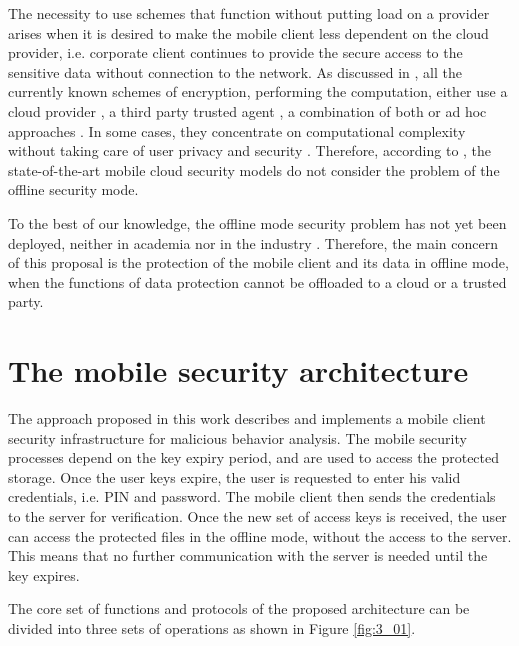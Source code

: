 The necessity to use schemes that function without putting load on a provider arises when it is desired to make the mobile client less dependent on the cloud provider, i.e. corporate client continues to provide the secure access to the sensitive data without connection to the network. As discussed in \cite{khan2015cloud}, all the currently known schemes of encryption, performing the computation, either use a cloud provider \cite{zhao2010trusted}, a third party trusted agent \cite{yang2011provable, heydari2016efficient}, a combination of both \cite{itani2010energy} or ad hoc approaches \cite{shila2016amcloud}. In some cases, they concentrate on computational complexity without taking care of user privacy and security \cite{ren2011lightweight}. Therefore, according to \cite{khan2013towards, khan2015cloud}, the state-of-the-art mobile cloud security models do not consider the problem of the offline security mode. 

To the best of our knowledge, the offline mode security problem has not yet been deployed, neither in academia nor in the industry \cite{yovel2014, khan2015cloud, khan2014survey, khan2013towards}. Therefore, the main concern of this proposal is the protection of the mobile client and its data in offline mode, when the functions of data protection cannot be offloaded to a cloud or a trusted party. 

\section{The mobile security architecture}
\label{sec:3_the_client_security_architecture}

The approach proposed in this work describes and implements a mobile client security infrastructure for malicious behavior analysis. The mobile security processes depend on the key expiry period, and are used to access the protected storage. Once the user keys expire, the user is requested to enter his valid credentials, i.e. PIN and password. The mobile client then sends the credentials to the server for verification. Once the new set of access keys is received, the user can access the protected files in the offline mode, without the access to the server. This means that no further communication with the server is needed until the key expires. 

The core set of functions and protocols of the proposed architecture can be divided into three sets of operations as shown in Figure \ref{fig:3_01}.

